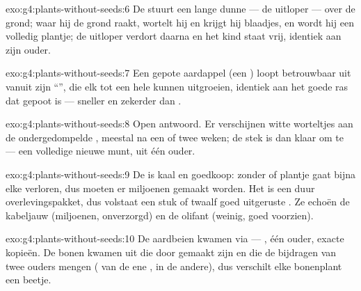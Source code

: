 \begin{solution}{exo:g4:plants-without-seeds:6}
De  stuurt een lange dunne  --- de uitloper --- over de
grond; waar hij de grond raakt, wortelt hij en krijgt hij blaadjes, en
wordt hij een volledig plantje; de uitloper verdort daarna en het kind
staat vrij, identiek aan zijn ouder.
\end{solution}

\begin{solution}{exo:g4:plants-without-seeds:7}
Een gepote aardappel (een ) loopt betrouwbaar uit vanuit zijn
``'', die elk tot een hele  kunnen uitgroeien, identiek aan
het goede ras dat gepoot is --- sneller en zekerder dan .
\end{solution}

\begin{solution}{exo:g4:plants-without-seeds:8}
Open antwoord. Er verschijnen witte worteltjes aan de ondergedompelde
, meestal na een of twee weken; de stek is dan klaar om te
 --- een volledige nieuwe munt, uit één ouder.
\end{solution}

\begin{solution}{exo:g4:plants-without-seeds:9}
De  is kaal en goedkoop: zonder  of plantje gaat
bijna elke  verloren, dus moeten er miljoenen gemaakt worden. Het
 is een duur overlevingspakket, dus volstaat een stuk of twaalf goed
uitgeruste . Ze echoën de kabeljauw (miljoenen, onverzorgd) en de
olifant (weinig, goed voorzien).
\end{solution}

\begin{solution}{exo:g4:plants-without-seeds:10}
De aardbeien kwamen via  --- , één
ouder, exacte kopieën. De bonen kwamen uit  die door 
gemaakt zijn en die de bijdragen van twee ouders mengen ( van
de ene ,  in de andere), dus verschilt elke bonenplant een
beetje.
\end{solution}

